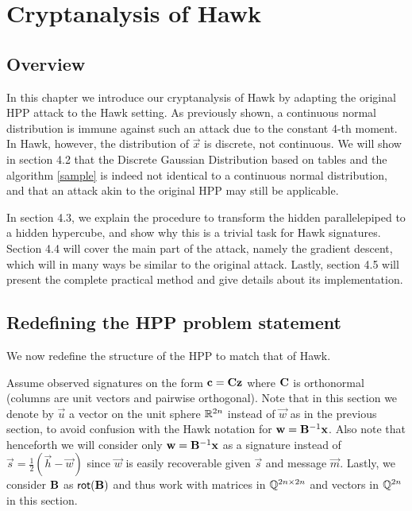 \chapter{Cryptanalysis of Hawk}

\section{Overview}
In this chapter we introduce our cryptanalysis of Hawk by adapting the original HPP attack to the Hawk setting.
As previously shown, a continuous normal distribution is immune against such an attack due to the constant 4-th moment. In Hawk, however, the distribution of $\vec{x}$ is discrete, not continuous.
We will show in section 4.2 that the Discrete Gaussian Distribution based on tables and the algorithm \ref{sample} is indeed not identical to a continuous normal distribution, and that an attack akin to the original HPP may still be applicable.

In section 4.3, we explain the procedure to transform the hidden parallelepiped to a hidden hypercube, and show why this is a trivial task for Hawk signatures.
Section 4.4 will cover the main part of the attack, namely the gradient descent, which will in many ways be similar to the original attack.
Lastly, section 4.5 will present the complete practical method and give details about its implementation.

\section{Redefining the HPP problem statement}

We now redefine the structure of the HPP to match that of Hawk.

Assume observed signatures on the form $\mathbf{c} = \mathbf{C} \mathbf{z}$ where $\mathbf{C}$ is orthonormal (columns are unit vectors and pairwise orthogonal). 
Note that in this section we denote by $\vec{u}$ a vector on the unit sphere $\mathbb{R}^{2n}$ instead of $\vec{w}$ as in the previous section, to avoid confusion with the Hawk notation for $\mathbf{w} = \mathbf{B}^{-1} \mathbf{x}$.
Also note that henceforth we will consider only $\mathbf{w} = \mathbf{B}^{-1} \mathbf{x}$ as a signature instead of $\vec{s} = \frac{1}{2}(\vec{h} - \vec{w})$ since $\vec{w}$ is easily recoverable given $\vec{s}$ and message $\vec{m}$.
Lastly, we consider $\mathbf{B}$ as $\mathsf{rot}(\mathbf{B})$ and thus work with matrices in $\mathbb{Q}^{2n \times 2n}$ and vectors in $\mathbb{Q}^{2n}$ in this section. 

